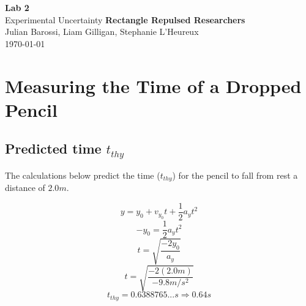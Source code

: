 \documentclass[11pt, letterpaper, includehead]{article}
\begin{document}
\begin{titlepage}
  \begin{center}
    \Huge{\textbf{Lab 2}}\\
    \Huge{Experimental Uncertainty}
    \vfill
    \large{\textbf{Rectangle Repulsed Researchers}}\\
    \large{Julian Barossi, Liam Gilligan, Stephanie L'Heureux}\\
    \vspace{0.5cm}
    \normalsize
    \today
  \end{center}
\end{titlepage}

\tableofcontents
\pagebreak %

\pagestyle{fancy}
\fancyhead{}

\section{Measuring the Time of a Dropped Pencil} %

\subsection{Predicted time $t_{thy}$} %
The calculations below predict the time ($t_{thy}$) for the pencil to
fall from rest a distance of $2.0m$.

$$y       = y_0 + v_{y_0}t + \frac{1}{2}a_yt^2$$
$$-y_0    = \frac{1}{2}a_yt^2$$
$$t       = \sqrt{\frac{-2y_0}{a_y}}$$
$$t       = \sqrt{\frac{-2(2.0m)}{-9.8m/s^2}}$$
$${t_{thy} = 0.6388765...s \Rightarrow  \boxed{0.64s}}$$
\end{document}
